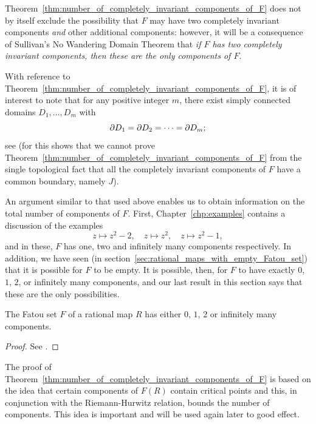 Theorem~\ref{thm:number_of_completely_invariant_components_of_F} does not by
itself exclude the possibility that $F$ may have two completely invariant
components \emph{and} other additional components: however, it will be a
consequence of Sullivan's No Wandering Domain Theorem that \emph{if $F$ has two
completely invariant components, then these are the only components of $F$}.

\begin{remark}[For any $m$, $\exists$ simply connected domains $D_1, \dots, D_m$ with $\boundary{D_1} =$ $\cdots =$ $\boundary{D_m}$]
    With reference to
    Theorem~\ref{thm:number_of_completely_invariant_components_of_F}, it is of
    interest to note that for any positive integer $m$, there exist simply
    connected domains $D_1, \dots, D_m$ with
    \begin{equation*}
        \partial {D_1} = \partial {D_2} = \cdots = \partial {D_m};
    \end{equation*}
    see \cite[143]{Hocking1961} (for this shows that we cannot prove
    Theorem~\ref{thm:number_of_completely_invariant_components_of_F} from the
    single topological fact that all the completely invariant components of $F$
    have a common boundary, namely $J$).
\end{remark}

An argument similar to that used above enables us to obtain information on the
total number of components of $F$. First, Chapter~\ref{chp:examples} contains a
discussion of the examples
\begin{equation*}
    z \mapsto z^2 - 2, \quad z \mapsto z^2, \quad z \mapsto z^2 -1,
\end{equation*}
and in these, $F$ has one, two and infinitely many components respectively. In
addition, we have seen (in section~\ref{sec:rational_maps_with_empty_Fatou_set})
that it is possible for $F$ to be empty. It is possible, then, for $F$ to have
exactly $0$, $1$, $2$, or infinitely many components, and our last result in
this section says that these are the only possibilities.

\begin{theorem}
    The Fatou set $F$ of a rational map $R$ has either $0$, $1$, $2$ or
    infinitely many components.
\end{theorem}
\begin{proof}
    See \cite[94]{Beardon1991}.
\end{proof}

\begin{remark}
    The proof of
    Theorem~\ref{thm:number_of_completely_invariant_components_of_F} is based on
    the idea that certain components of $F(R)$ contain critical points and this,
    in conjunction with the Riemann-Hurwitz relation, bounds the number of
    components. This idea is important and will be used again later to good
    effect.
\end{remark}

